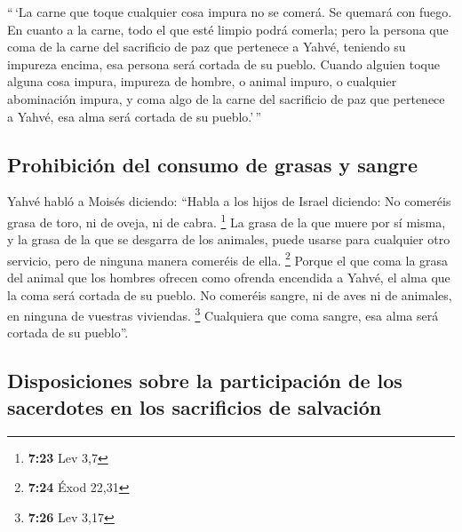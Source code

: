  ``\,`La carne que toque cualquier cosa impura no se
comerá. Se quemará con fuego. En cuanto a la carne, todo el que esté
limpio podrá comerla;  pero la persona que coma de la
carne del sacrificio de paz que pertenece a Yahvé, teniendo su impureza
encima, esa persona será cortada de su pueblo.  Cuando
alguien toque alguna cosa impura, impureza de hombre, o animal impuro, o
cualquier abominación impura, y coma algo de la carne del sacrificio de
paz que pertenece a Yahvé, esa alma será cortada de su pueblo.'\,''

\hypertarget{prohibiciuxf3n-del-consumo-de-grasas-y-sangre}{%
\subsection{Prohibición del consumo de grasas y
sangre}\label{prohibiciuxf3n-del-consumo-de-grasas-y-sangre}}

 Yahvé habló a Moisés diciendo:  ``Habla a
los hijos de Israel diciendo: No comeréis grasa de toro, ni de oveja, ni
de cabra. \footnote{\textbf{7:23} Lev 3,7}  La grasa de
la que muere por sí misma, y la grasa de la que se desgarra de los
animales, puede usarse para cualquier otro servicio, pero de ninguna
manera comeréis de ella. \footnote{\textbf{7:24} Éxod 22,31}
 Porque el que coma la grasa del animal que los hombres
ofrecen como ofrenda encendida a Yahvé, el alma que la coma será cortada
de su pueblo.  No comeréis sangre, ni de aves ni de
animales, en ninguna de vuestras viviendas. \footnote{\textbf{7:26} Lev
  3,17}  Cualquiera que coma sangre, esa alma será
cortada de su pueblo''.

\hypertarget{disposiciones-sobre-la-participaciuxf3n-de-los-sacerdotes-en-los-sacrificios-de-salvaciuxf3n}{%
\subsection{Disposiciones sobre la participación de los sacerdotes en
los sacrificios de
salvación}\label{disposiciones-sobre-la-participaciuxf3n-de-los-sacerdotes-en-los-sacrificios-de-salvaciuxf3n}}

